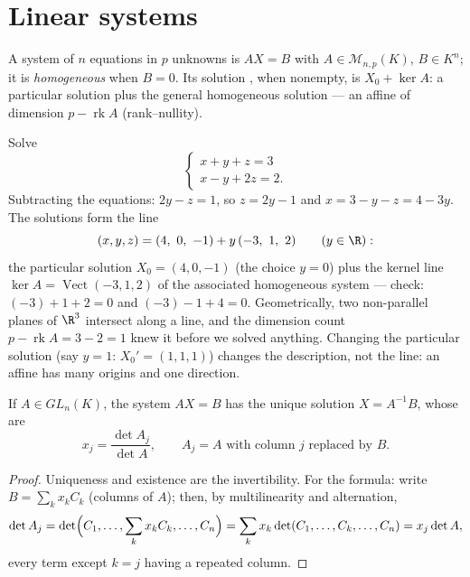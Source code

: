 \section{Linear systems}

\begin{definition}\label{def:b1:det:system}
A  system of $n$ equations in $p$
unknowns is $AX = B$ with $A \in \mathcal{M}_{n,p}(K)$, $B \in
K^n$; it is \emph{homogeneous} when $B = 0$. Its solution , when
nonempty, is $X_0 + \ker A$: a particular solution plus the general
homogeneous solution --- an affine  of dimension $p -
\operatorname{rk} A$ (rank--nullity).
\end{definition}

\begin{example}
\label{ex:b1:det:affinestructure}
Solve
\[
\begin{cases}
x + y + z = 3\\
x - y + 2z = 2 .
\end{cases}
\]
Subtracting the equations: $2y - z = 1$, so $z = 2y - 1$ and $x =
3 - y - z = 4 - 3y$. The solutions form the line
\[
(x, y, z) = (4,\ 0,\ -1) + y\,(-3,\ 1,\ 2)
\qquad (y \in \R):
\]
the particular solution $X_0 = (4, 0, -1)$ (the choice $y = 0$)
plus the kernel line $\ker A = \operatorname{Vect}(-3, 1, 2)$ of
the associated homogeneous system --- check: $(-3) + 1 + 2 = 0$
and $(-3) - 1 + 4 = 0$. Geometrically, two non-parallel planes of
$\R^3$ intersect along a line, and the dimension count $p -
\operatorname{rk} A = 3 - 2 = 1$ knew it before we solved
anything. Changing the particular solution (say $y = 1$: $X_0' =
(1, 1, 1)$) changes the description, not the line: an affine
 has many origins and one direction.
\end{example}

\begin{theorem}\label{thm:b1:det:cramer}
If $A \in GL_n(K)$, the system $AX = B$ has the unique solution $X =
A^{-1}B$, whose  are
\[
x_j = \frac{\det A_j}{\det A},
\qquad A_j = A \text{ with column } j \text{ replaced by } B .
\]
\end{theorem}

\begin{proof}
Uniqueness and existence are the invertibility. For the formula:
write $B = \sum_k x_k C_k$ (columns of $A$); then, by
multilinearity and alternation,
\[
\det A_j = \det\Bigl(C_1, \dots, \sum_k x_k C_k, \dots, C_n\Bigr)
= \sum_k x_k \det(C_1, \dots, C_k, \dots, C_n)
= x_j \det A ,
\]
every term except $k = j$ having a repeated column.
\end{proof}

